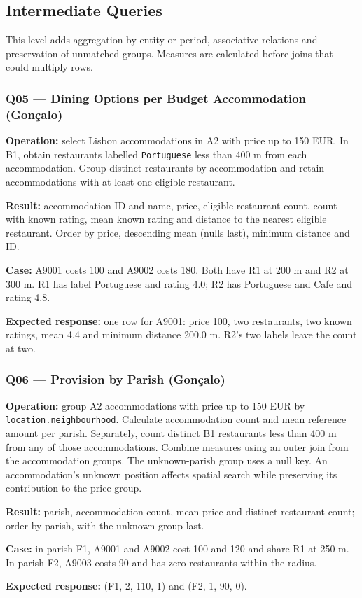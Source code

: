 \subsection{Intermediate Queries}
This level adds aggregation by entity or period, associative relations and preservation of unmatched groups. Measures are calculated before joins that could multiply rows.
\subsubsection{Q05 --- Dining Options per Budget Accommodation (Gonçalo)}
\textbf{Operation:} select Lisbon accommodations in A2 with price up to 150 EUR. In B1, obtain restaurants labelled \texttt{Portuguese} less than 400 m from each accommodation. Group distinct restaurants by accommodation and retain accommodations with at least one eligible restaurant.\par
\textbf{Result:} accommodation ID and name, price, eligible restaurant count, count with known rating, mean known rating and distance to the nearest eligible restaurant. Order by price, descending mean (nulls last), minimum distance and ID.\par
\textbf{Case:} A9001 costs 100 and A9002 costs 180. Both have R1 at 200 m and R2 at 300 m. R1 has label Portuguese and rating 4.0; R2 has Portuguese and Cafe and rating 4.8.\par
\textbf{Expected response:} one row for A9001: price 100, two restaurants, two known ratings, mean 4.4 and minimum distance 200.0 m. R2's two labels leave the count at two.
\subsubsection{Q06 --- Provision by Parish (Gonçalo)}
\textbf{Operation:} group A2 accommodations with price up to 150 EUR by \texttt{location.\allowbreak{}neighbourhood}. Calculate accommodation count and mean reference amount per parish. Separately, count distinct B1 restaurants less than 400 m from any of those accommodations. Combine measures using an outer join from the accommodation groups. The unknown-parish group uses a null key. An accommodation's unknown position affects spatial search while preserving its contribution to the price group.\par
\textbf{Result:} parish, accommodation count, mean price and distinct restaurant count; order by parish, with the unknown group last.\par
\textbf{Case:} in parish F1, A9001 and A9002 cost 100 and 120 and share R1 at 250 m. In parish F2, A9003 costs 90 and has zero restaurants within the radius.\par
\textbf{Expected response:} (F1, 2, 110, 1) and (F2, 1, 90, 0).
